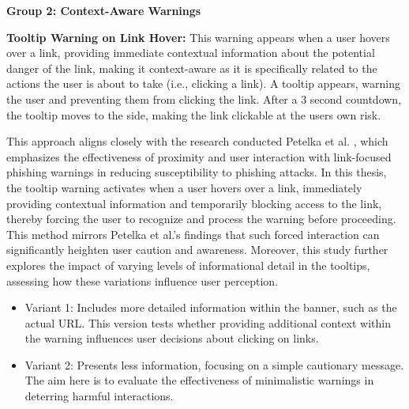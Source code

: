 \documentclass[
  a4paper,  %
  twoside,  %
  bibliography=totoc,
  headsepline,
  cleardoublepage=empty,
  parskip=half,
  draft=false
]{scrbook}
\begin{document}
\textbf{Group 2: Context-Aware Warnings}

\textbf{Tooltip Warning on Link Hover:} This warning appears when a user hovers over a link, providing immediate contextual information about the potential danger of the link, making it context-aware as it is specifically related to the actions the user is about to take (i.e., clicking a link). A tooltip appears, warning the user and preventing them from clicking the link. After a 3 second countdown, the tooltip moves to the side, making the link clickable at the users own risk. 

This approach aligns closely with the research conducted Petelka et al. \cite{petelka}, which emphasizes the effectiveness of proximity and user interaction with link-focused phishing warnings in reducing susceptibility to phishing attacks. In this thesis, the tooltip warning activates when a user hovers over a link, immediately providing contextual information and temporarily blocking access to the link, thereby forcing the user to recognize and process the warning before proceeding. This method mirrors Petelka et al.'s findings that such forced interaction can significantly heighten user caution and awareness. Moreover, this study further explores the impact of varying levels of informational detail in the tooltips, assessing how these variations influence user perception.

\begin{itemize}
    \item Variant 1: Includes more detailed information within the banner, such as the actual URL. This version tests whether providing additional context within the warning influences user decisions about clicking on links.
    \item Variant 2: Presents less information, focusing on a simple cautionary message. The aim here is to evaluate the effectiveness of minimalistic warnings in deterring harmful interactions.
\end{itemize}
\end{document}
